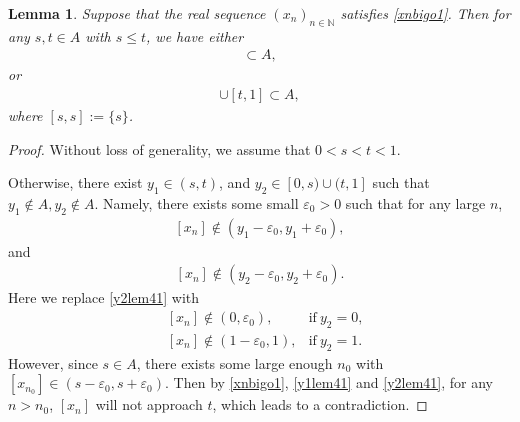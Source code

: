 \documentclass[12pt]{amsart}
\theoremstyle{plain}
\newtheorem{lemma}[theorem]{Lemma}
\theoremstyle{definition}
\begin{document}
\begin{lemma}\label{casesxn}
	Suppose that the real sequence $(x_n)_{n\in\mathbb{N}}$
	 satisfies \eqref{xnbigo1}.
	Then for any $s,t\in A$ with $s\leq t$, we have either
	\begin{align}
		[s,t]\subset A,\nonumber
	\end{align}
	or
	\begin{align}
		[0,s]\cup[t,1]\subset A,\nonumber
	\end{align}
	where $[s,s]:=\{s\}$.
\end{lemma}
\begin{proof}
	Without loss of generality, we assume that $0<s<t<1.$
	
	Otherwise, there exist $y_1\in (s,t)$, and $y_2\in [0,s)\cup (t,1]$ such that $y_1\notin A, y_2\notin A$. Namely,  there exists some small $\varepsilon_0>0$ such that for any large $n$,
	\begin{align}
		\left[x_n\right]\notin (y_1-\varepsilon_0,y_1+\varepsilon_0),\label{y1lem41}
	\end{align}
	and 
	\begin{align}
		\left[x_n\right]\notin (y_2-\varepsilon_0,y_2+\varepsilon_0).\label{y2lem41}
	\end{align}
	Here we replace \eqref{y2lem41} with
	\begin{align}
		&\left[x_n\right]\notin (0,\varepsilon_0),&\mathrm{if}\ y_2=0,\nonumber\\
&\left[x_n\right]\notin (1-\varepsilon_0,1), &\mathrm{if}\ y_2=1.\nonumber
	\end{align}
	However, since $s\in A$, there exists some large enough $n_0$ with $\left[x_{n_0}\right]\in (s-\varepsilon_0,s+\varepsilon_0)$. Then by \eqref{xnbigo1}, \eqref{y1lem41} and \eqref{y2lem41}, for any $n>n_0$, $\left[x_n\right]$ will not approach $t$, which leads to a contradiction. 
\end{proof}
\end{document}
